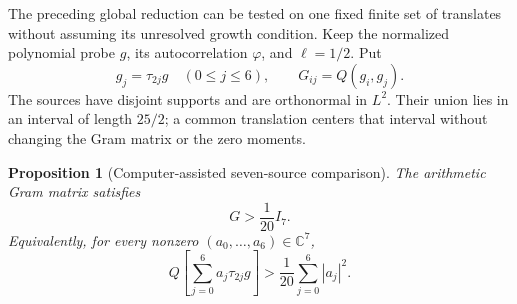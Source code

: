 \documentclass[11pt]{article}
\numberwithin{equation}{section}
\newtheorem{proposition}[theorem]{Proposition}
\theoremstyle{definition}
\theoremstyle{remark}
\begin{document}
The preceding global reduction can be tested on one fixed finite set
of translates without assuming its unresolved growth condition.  Keep
the normalized polynomial probe \(g\), its autocorrelation \(\varphi\),
and \(\ell=1/2\).  Put
\[
 g_j=\tau_{2j}g\quad(0\leq j\leq6),\qquad
 G_{ij}=Q(g_i,g_j).
\]
The sources have disjoint supports and are orthonormal in \(L^2\).
Their union lies in an interval of length \(25/2\); a common translation
centers that interval without changing the Gram matrix or the zero
moments.

\begin{proposition}[Computer-assisted seven-source comparison]
\label{prop:seven-source-gram}
The arithmetic Gram matrix satisfies
\begin{equation}\label{eq:seven-source-gram-bound}
 G>\frac1{20}I_7.
\end{equation}
Equivalently, for every nonzero \((a_0,\ldots,a_6)\in\mathbb C^7\),
\[
 Q\!\left[\sum_{j=0}^6a_j\tau_{2j}g\right]
 >\frac1{20}\sum_{j=0}^6|a_j|^2.
\]
\end{proposition}
\end{document}
